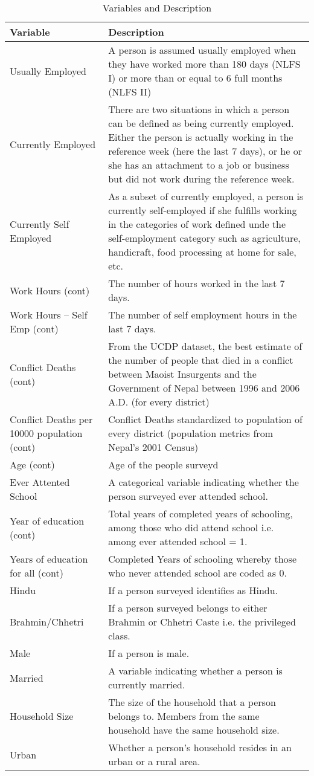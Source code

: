 
\begin{table}[H]
	\caption{Variables and Description}
	
	\renewcommand{\arraystretch}{1.2}
	
	\begin{tabular}{|>{\centering}p{5cm}|>{\centering}p{10cm}|}
		\hline 
		Variable & Description\tabularnewline
		\hline 
		\hline 
		Usually Employed  & A person is assumed usually employed when they have worked more than
		180 days (NLFS I) or more than or equal to 6 full months (NLFS II)\tabularnewline
		\hline 
		Currently Employed  & There are two situations in which a person can be defined as being
		currently employed. Either the person is actually working in the reference
		week (here the last 7 days), or he or she has an attachment to a job
		or business but did not work during the reference week.\tabularnewline
		\hline 
		Currently Self Employed  & As a subset of currently employed, a person is currently self-employed
		if she fulfills working in the categories of work defined unde the
		self-employment category such as agriculture, handicraft, food processing
		at home for sale, etc.\tabularnewline
		\hline 
		Work Hours (cont) & The number of hours worked in the last 7 days.\tabularnewline
		\hline 
		Work Hours -- Self Emp (cont) & The number of self employment hours in the last 7 days.\tabularnewline
		\hline 
		Conflict Deaths (cont) & From the UCDP dataset, the best estimate of the number of people that
		died in a conflict between Maoist Insurgents and the Government of
		Nepal between 1996 and 2006 A.D. (for every district)\tabularnewline
		\hline 
		Conflict Deaths per 10000 population (cont) & Conflict Deaths standardized to population of every district (population
		metrics from Nepal's 2001 Census)\tabularnewline
		\hline 
		Age (cont) & Age of the people surveyd\tabularnewline
		\hline 
		Ever Attented School  & A categorical variable indicating whether the person surveyed ever
		attended school.\tabularnewline
		\hline 
		Year of education (cont) & Total years of completed years of schooling, among those who did attend
		school i.e. among ever attended school = 1.\tabularnewline
		\hline 
		Years of education for all (cont) & Completed Years of schooling whereby those who never attended school
		are coded as 0.\tabularnewline
		\hline 
		Hindu  & If a person surveyed identifies as Hindu.\tabularnewline
		\hline 
		Brahmin/Chhetri  & If a person surveyed belongs to either Brahmin or Chhetri Caste i.e.
		the privileged class.\tabularnewline
		\hline 
		Male  & If a person is male.\tabularnewline
		\hline 
		Married  & A variable indicating whether a person is currently married.\tabularnewline
		\hline 
		Household Size & The size of the household that a person belongs to. Members from the
		same household have the same household size.\tabularnewline
		\hline 
		Urban & Whether a person's household resides in an urban or a rural area.\tabularnewline
		\hline 
	\end{tabular}
\end{table}